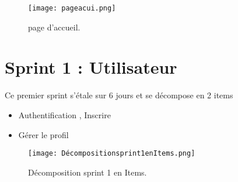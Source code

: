\begin{figure}[ht]
	\centering
	\texttt{[image: pageacui.png]}
	\caption{page d'accueil.}
	\label{fig:page d'accueil }
\end{figure}
\FloatBarrier
\clearpage 
\section{Sprint 1 : Utilisateur }
\label{sec:conception}

\begin{fquote}
Ce premier sprint s’étale sur 6 jours et se décompose en 2 items  \end{fquote}
\smallskip
\begin{itemize}[label=$\diamond$]
	\item Authentification , Inscrire
	\item Gérer le profil
\end{itemize}
\medskip
\medskip
\medskip
\medskip
\medskip
\medskip
\medskip
\medskip
\medskip
\medskip
\begin{figure}[ht]
	\centering
	\texttt{[image: Décompositionsprint1enItems.png]}
	\caption{Décomposition sprint 1 en Items.}
	\label{fig:Décomposition sprint 1 en Items}
\end{figure}
\FloatBarrier
\clearpage

